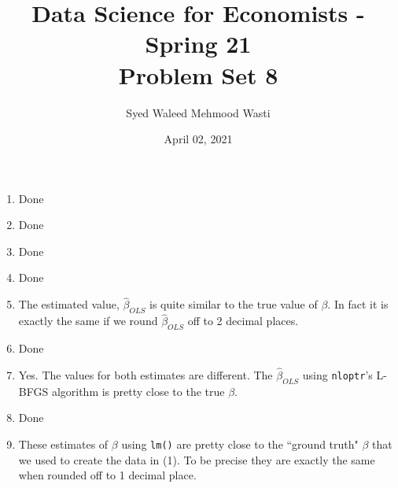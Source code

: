 \documentclass[12pt]{article}
\title{\textbf{Data Science for Economists - Spring 21 \\
\vspace{0.5cm}
Problem Set 8}}
\author{Syed Waleed Mehmood Wasti}
\date{April 02, 2021}
\begin{document}
\begin{titlepage}
\maketitle
\thispagestyle{empty}
\end{titlepage}


\begin{enumerate}


\item
Done

\item
Done

\item
Done

\item
Done

\item
The estimated value, $\hat{\beta}_{OLS}$ is quite similar to the true value of $\beta$. In fact it is exactly the same if we round $\hat{\beta}_{OLS}$ off to 2 decimal places. 

\item
Done

\item
Yes. The values for both estimates are different. The $\hat{\beta}_{OLS} $ using \verb|nloptr|’s L-BFGS algorithm is pretty close to the true $\beta$. 

\item
Done


\newpage

\item

These estimates of $\beta$ using \verb|lm()| are pretty close to the ``ground truth" $\beta$ that we used to create the data in (1). To be precise they are exactly the same when rounded off to 1 decimal place. 



\end{enumerate}
\end{document}
